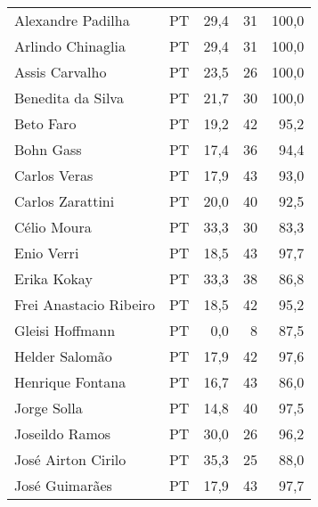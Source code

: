 \begin{longtable}{llrrr}
                   Alexandre Padilha &             PT &      29,4 &           31 &      100,0 \\
                   Arlindo Chinaglia &             PT &      29,4 &           31 &      100,0 \\
                      Assis Carvalho &             PT &      23,5 &           26 &      100,0 \\
                   Benedita da Silva &             PT &      21,7 &           30 &      100,0 \\
                           Beto Faro &             PT &      19,2 &           42 &       95,2 \\
                           Bohn Gass &             PT &      17,4 &           36 &       94,4 \\
                        Carlos Veras &             PT &      17,9 &           43 &       93,0 \\
                    Carlos Zarattini &             PT &      20,0 &           40 &       92,5 \\
                         Célio Moura &             PT &      33,3 &           30 &       83,3 \\
                          Enio Verri &             PT &      18,5 &           43 &       97,7 \\
                         Erika Kokay &             PT &      33,3 &           38 &       86,8 \\
              Frei Anastacio Ribeiro &             PT &      18,5 &           42 &       95,2 \\
                     Gleisi Hoffmann &             PT &       0,0 &            8 &       87,5 \\
                      Helder Salomão &             PT &      17,9 &           42 &       97,6 \\
                    Henrique Fontana &             PT &      16,7 &           43 &       86,0 \\
                         Jorge Solla &             PT &      14,8 &           40 &       97,5 \\
                      Joseildo Ramos &             PT &      30,0 &           26 &       96,2 \\
                  José Airton Cirilo &             PT &      35,3 &           25 &       88,0 \\
                      José Guimarães &             PT &      17,9 &           43 &       97,7 \\

\end{longtable}
